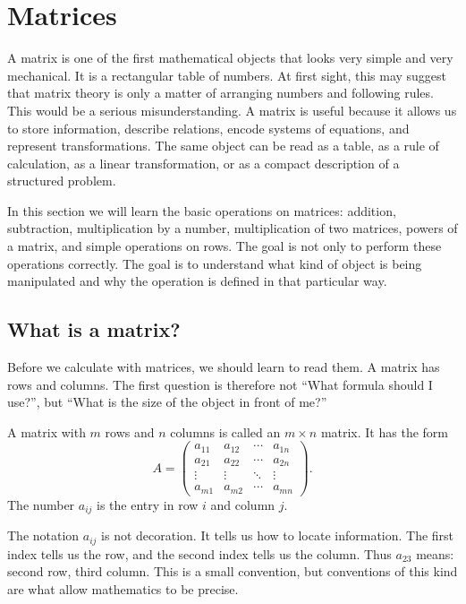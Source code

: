 \section{Matrices}

A matrix is one of the first mathematical objects that looks very simple and very mechanical. It is a rectangular table of numbers. At first sight, this may suggest that matrix theory is only a matter of arranging numbers and following rules. This would be a serious misunderstanding. A matrix is useful because it allows us to store information, describe relations, encode systems of equations, and represent transformations. The same object can be read as a table, as a rule of calculation, as a linear transformation, or as a compact description of a structured problem.

In this section we will learn the basic operations on matrices: addition, subtraction, multiplication by a number, multiplication of two matrices, powers of a matrix, and simple operations on rows. The goal is not only to perform these operations correctly. The goal is to understand what kind of object is being manipulated and why the operation is defined in that particular way.

\subsection{What is a matrix?}

Before we calculate with matrices, we should learn to read them. A matrix has rows and columns. The first question is therefore not ``What formula should I use?'', but ``What is the size of the object in front of me?''

\begin{definitionbox}
A matrix with \(m\) rows and \(n\) columns is called an \(m \times n\) matrix. It has the form
\[
A=
\begin{pmatrix}
a_{11} & a_{12} & \cdots & a_{1n}\\
a_{21} & a_{22} & \cdots & a_{2n}\\
\vdots & \vdots & \ddots & \vdots\\
a_{m1} & a_{m2} & \cdots & a_{mn}
\end{pmatrix}.
\]
The number \(a_{ij}\) is the entry in row \(i\) and column \(j\).
\end{definitionbox}

The notation \(a_{ij}\) is not decoration. It tells us how to locate information. The first index tells us the row, and the second index tells us the column. Thus \(a_{23}\) means: second row, third column. This is a small convention, but conventions of this kind are what allow mathematics to be precise.

